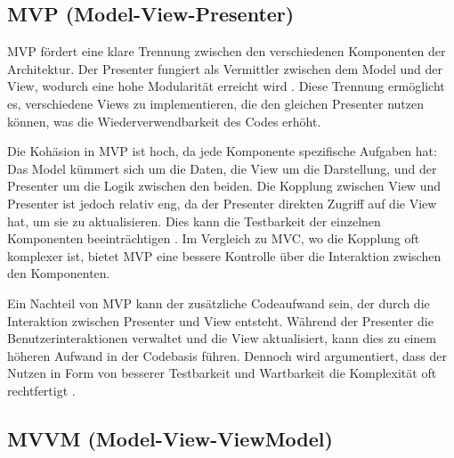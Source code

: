 \subsection{MVP (Model-View-Presenter)}

MVP fördert eine klare Trennung zwischen den verschiedenen
Komponenten der Architektur. Der Presenter fungiert als Vermittler
zwischen dem Model und der View, wodurch eine hohe Modularität
erreicht wird \cite{qureshi2024}. Diese Trennung ermöglicht
es, verschiedene Views zu implementieren, die den gleichen
Presenter nutzen können, was die Wiederverwendbarkeit des Codes
erhöht.

Die Kohäsion in MVP ist hoch, da jede Komponente spezifische
Aufgaben hat: Das Model kümmert sich um die Daten, die View
um die Darstellung, und der Presenter um die Logik zwischen
den beiden. Die Kopplung zwischen View und Presenter ist
jedoch relativ eng, da der Presenter direkten Zugriff auf die
View hat, um sie zu aktualisieren. Dies kann die Testbarkeit
der einzelnen Komponenten beeinträchtigen \cite{aihara2012mvc}. Im
Vergleich zu MVC, wo die Kopplung oft komplexer ist, bietet
MVP eine bessere Kontrolle über die Interaktion zwischen den
Komponenten.

Ein Nachteil von MVP kann der zusätzliche Codeaufwand sein,
der durch die Interaktion zwischen Presenter und View entsteht.
Während der Presenter die Benutzerinteraktionen verwaltet und
die View aktualisiert, kann dies zu einem höheren Aufwand in
der Codebasis führen. Dennoch wird argumentiert, dass der
Nutzen in Form von besserer Testbarkeit und Wartbarkeit die
Komplexität oft rechtfertigt \cite{qureshi2024}. 

\subsection{MVVM (Model-View-ViewModel)}

